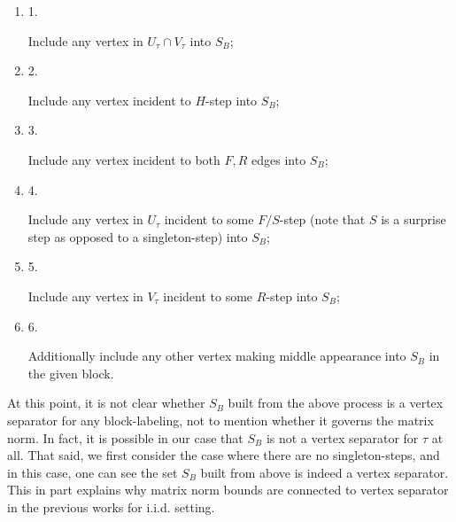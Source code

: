 \begin{enumerate}


\item[] 
1. 


Include any vertex in $U_{\tau}\cap V_{\tau}$ into $S_{B}$;\par





\item[] 
2. 


Include any vertex incident to $H$-step into $S_{B}$;\par





\item[] 
3. 


Include any vertex incident to both $F,R$ edges into $S_{B}$;\par





\item[] 
4. 


Include any vertex in $U_{\tau}$ incident to some $F/S$-step (note that $S$ is a surprise step as opposed to a singleton-step) into $S_{B}$;\par





\item[] 
5. 


Include any vertex in $V_{\tau}$ incident to some $R$-step into $S_{B}$;\par





\item[] 
6. 


Additionally include any other vertex making middle appearance into $S_{B}$ in the given block.\par





\end{enumerate}




At this point, it is not clear whether $S_{B}$ built from the above process is a vertex separator for any block-labeling, not to mention whether it governs the matrix norm. In fact, it is possible in our case that $S_{B}$ is not a vertex separator for $\tau$ at all. That said, we first consider the case where there are no singleton-steps, and in this case, one can see the set $S_{B}$ built from above is indeed a vertex separator. This in part explains why matrix norm bounds are connected to vertex separator in the previous works for i.i.d. setting.\par



